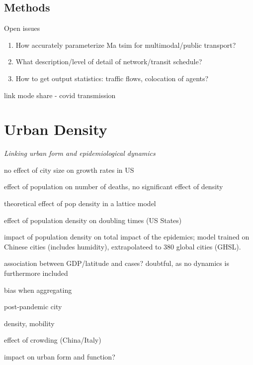 \documentclass[10pt]{article}
\begin{document}
\subsection{Methods}

Open issues
\begin{enumerate}
	\item How accurately parameterize Ma	tsim for multimodal/public transport?
	\item What description/level of detail of network/transit schedule?
	\item How to get output statistics: traffic flows, colocation of agents?
\end{enumerate}




\cite{chen2021effects} link mode share - covid transmission


	
\section{Urban Density}

\textit{Linking urban form and epidemiological dynamics}


\cite{2020arXiv200401248H} no effect of city size on growth rates in US
	
\cite{angel2020coronavirus} effect of population on number of deaths, no significant effect of density

\cite{tarwater2001effects} theoretical effect of pop density in a lattice model	

\cite{White2020.04.14.20065318} effect of population density on doubling times (US States)
	
\cite{Rader2020.04.15.20064980} impact of population density on total impact of the epidemics; model trained on Chinese cities (includes humidity), extrapolateed to 380 global cities (GHSL).

\cite{2020arXiv200400110M} association between GDP/latitude and cases? doubtful, as no dynamics is furthermore included

\cite{2020arXiv200412994B} bias when aggregating

\cite{doi:10.1177/2399808320926912} post-pandemic city

\cite{bouffanais2020cities} density, mobility

	
\cite{rader2020crowding} effect of crowding (China/Italy)
	
\cite{batty2020social} impact on urban form and function?
\end{document}
